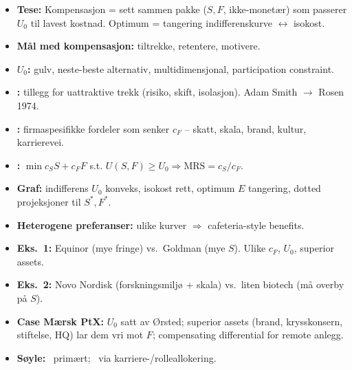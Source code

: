 \begin{itemize}\setlength{\itemsep}{2pt}
\item \textbf{Tese:} Kompensasjon = sett sammen pakke ($S, F$, ikke-monetær) som passerer $U_0$ til lavest kostnad. Optimum = tangering indifferenskurve $\leftrightarrow$ isokost.
\item \textbf{Mål med kompensasjon:} tiltrekke, retentere, motivere.
\item \textbf{ $U_0$:} gulv, neste-beste alternativ, multidimensjonal, participation constraint.
\item \textbf{:} tillegg for uattraktive trekk (risiko, skift, isolasjon). Adam Smith $\to$ Rosen 1974.
\item \textbf{:} firmaspesifikke fordeler som senker $c_F$ -- skatt, skala, brand, kultur, karrierevei.
\item \textbf{:} $\min c_S S + c_F F$ s.t. $U(S,F) \geq U_0 \Rightarrow \mathrm{MRS} = c_S/c_F$.
\item \textbf{Graf:} indifferens $U_0$ konveks, isokost rett, optimum $E$ tangering, dotted projeksjoner til $S^*, F^*$.
\item \textbf{Heterogene preferanser:} ulike kurver $\Rightarrow$ cafeteria-style benefits.
\item \textbf{Eks.\ 1:} Equinor (mye fringe) vs.\ Goldman (mye $S$). Ulike $c_F$, $U_0$, superior assets.
\item \textbf{Eks.\ 2:} Novo Nordisk (forskningsmiljø + skala) vs.\ liten biotech (må overby på $S$).
\item \textbf{Case Mærsk PtX:} $U_0$ satt av Ørsted; superior assets (brand, krysskonsern, stiftelse, HQ) lar dem vri mot $F$; compensating differential for remote anlegg.
\item \textbf{Søyle:} \SThree\ primært; \SOne\ via karriere-/rolleallokering.
\end{itemize}
